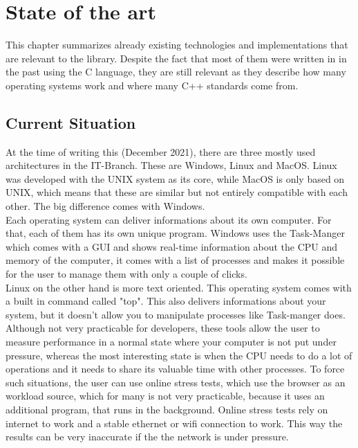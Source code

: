 \chapter{State of the art}
This chapter summarizes already existing technologies and implementations that are relevant to the library. Despite the fact that most of them were written in in the past using the C language, they are still relevant as they describe how many operating systems work and where many C++ standards come from.   
\section{Current Situation} 
At the time of writing this (December 2021), there are three mostly used architectures in the IT-Branch. These are Windows, Linux and MacOS. Linux was developed with the UNIX system as its core, while MacOS is only based on UNIX, which means that these are similar but not entirely compatible with each other. The big difference comes with Windows.\\
Each operating system can deliver informations about its own computer.
For that, each of them has its own unique program. Windows uses the \dq Task-Manger\dq{} which comes with a GUI and shows real-time information about the CPU and memory of the computer, it comes with a list of processes and makes it possible for the user to manage them with only a couple of clicks.\\
Linux on the other hand is more text oriented. This operating system comes with a built in command called "top". This also delivers informations about your system, but it doesn't allow you to manipulate processes like \dq Task-manger\dq{} does. Although not very practicable for developers, these tools allow the user to measure performance in a normal state where your computer is not put under pressure, whereas the most interesting state is when the CPU needs to do a lot of operations and it needs to share its valuable time with other processes. To force such situations, the user can use online stress tests, which use the browser as an workload source, which for many is not very practicable, because it uses an additional program, that runs in the background. Online stress tests rely on internet to work and a stable ethernet or wifi connection to work. This way the results can be very inaccurate if the the network is under pressure.
